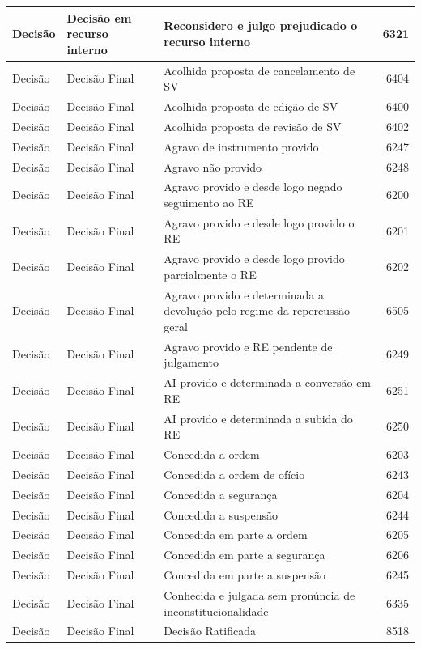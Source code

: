 \documentclass[
]{book}
\begin{document}
\begin{tabular}{l|l|l|r}
\hline
Decisão & Decisão em recurso interno & Reconsidero e julgo prejudicado o recurso interno & 6321\\
\hline
Decisão & Decisão Final & Acolhida proposta de cancelamento de SV & 6404\\
\hline
Decisão & Decisão Final & Acolhida proposta de edição de SV & 6400\\
\hline
Decisão & Decisão Final & Acolhida proposta de revisão de SV & 6402\\
\hline
Decisão & Decisão Final & Agravo de instrumento provido & 6247\\
\hline
Decisão & Decisão Final & Agravo não provido & 6248\\
\hline
Decisão & Decisão Final & Agravo provido e desde logo negado seguimento ao RE & 6200\\
\hline
Decisão & Decisão Final & Agravo provido e desde logo provido o RE & 6201\\
\hline
Decisão & Decisão Final & Agravo provido e desde logo provido parcialmente o RE & 6202\\
\hline
Decisão & Decisão Final & Agravo provido e determinada a devolução pelo regime da repercussão geral & 6505\\
\hline
Decisão & Decisão Final & Agravo provido e RE pendente de julgamento & 6249\\
\hline
Decisão & Decisão Final & AI provido e determinada a conversão em RE & 6251\\
\hline
Decisão & Decisão Final & AI provido e determinada a subida do RE & 6250\\
\hline
Decisão & Decisão Final & Concedida a ordem & 6203\\
\hline
Decisão & Decisão Final & Concedida a ordem de ofício & 6243\\
\hline
Decisão & Decisão Final & Concedida a segurança & 6204\\
\hline
Decisão & Decisão Final & Concedida a suspensão & 6244\\
\hline
Decisão & Decisão Final & Concedida em parte a ordem & 6205\\
\hline
Decisão & Decisão Final & Concedida em parte a segurança & 6206\\
\hline
Decisão & Decisão Final & Concedida em parte a suspensão & 6245\\
\hline
Decisão & Decisão Final & Conhecida e julgada sem pronúncia de inconstitucionalidade & 6335\\
\hline
Decisão & Decisão Final & Decisão Ratificada & 8518\\

\end{tabular}
\end{document}
